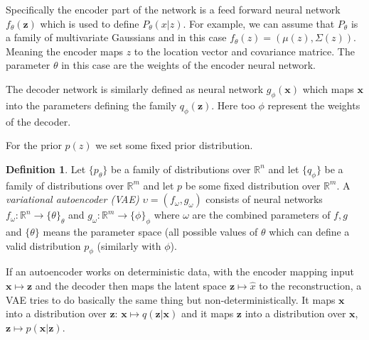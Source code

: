 \documentclass[11pt, a4paper]{report}
\theoremstyle{plain}
\theoremstyle{definition}
\newtheorem{mydef}{Definition}[chapter]
\theoremstyle{remark}
\newcommand{\R}{\mathbb{R}}
\newcommand{\x}{\mathbf{x}}
\newcommand{\z}{\mathbf{z}}
\begin{document}
Specifically the encoder part of the network is a feed forward neural network 
$f_{\theta}(\z)$ which is
used to define $P_{\theta}(x|z)$. For example, we can assume that $P_{\theta}$
is a family of multivariate Gaussians and in this case $f_{\theta}(z) =
(\mu(z), \Sigma(z))$. Meaning the encoder maps $z$ to the location vector and
covariance matrice. The parameter $\theta$ in this case are the weights of the
encoder neural network. 

The decoder network is similarly defined as neural network $g_{\phi}(\x)$ which
maps $\x$ into the parameters defining the family $q_{\phi}(\z)$. Here too $\phi$
represent the weights of the decoder.

For the prior $p(z)$ we set some fixed prior distribution.

\begin{mydef}
\label{def:vae}
Let $\{p_{\theta}\}$ be a family of distributions over $\R^n$ and let
$\{q_{\phi}\}$ be a family of distributions over $\R^m$ and let $p$ be some
fixed distribution over $\R^m$. A \emph{variational autoencoder (VAE)} $\upsilon
= (f_{\omega}, g_{\omega})$ consists of neural networks $f_{\omega}: \R^n \to
\{\theta\}_{\theta}$ and $g_{\omega}: \R^m \to \{\phi\}_{\phi}$ where $\omega$
are the combined parameters of $f,g$ and $\{\theta \}$ means the parameter space
(all possible values of $\theta$ which can define a valid distribution
$p_{\phi}$ (similarly with $\phi$). \end{mydef}




If an autoencoder works on deterministic data, 
with the encoder mapping input $\x \mapsto \z$ and the decoder then maps the
latent space $\z \mapsto \hat{x}$ to the reconstruction, a VAE tries to do
basically the same thing but non-deterministically.
It maps $\x$ into a distribution over $\z$: $\x \mapsto q(\z|\x)$ and it maps
$\z$ into a distribution over $\x$, $\z \mapsto p(\x|\z)$.
\end{document}
